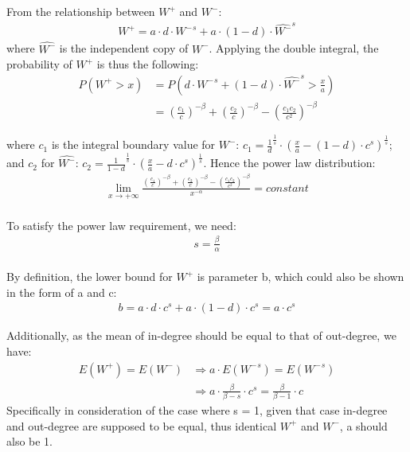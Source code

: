 \documentclass{article}
\begin{document}
From the relationship between $W^{+}$ and $W^{-}$: 
  \begin{align*}
 W^{+} = a \cdot d \cdot{W^{-}}^{s} + a \cdot (1-d) \cdot {\hat{W^{-}}} ^{s} 
 \end{align*}
 where $\hat{W^{-}}$ is the independent copy of $W^{-}$. Applying the double integral, the probability of $W^{+}$ is thus the following:
  \begin{align*}
 P( W^{+} > x ) & = P( d \cdot{W^{-}}^{s} + (1 - d) \cdot {\hat{W^{-}}} ^{s} > \frac{x}{a} ) \\
          & =  {(\frac{c_{1}}{c})}^{-\beta} +  {(\frac{c_{2}}{c})}^{-\beta} -  {(\frac{ c_{1}c_{2}   }{ c^{2} })}^{-\beta}
 \end{align*}
 
 where $c_{1}$ is the integral boundary value for $W^{-}$: $c_{1} = {\frac{1}{d}}^{\frac{1}{s}} \cdot {( \frac{x}{a} - (1-d) \cdot c^{s})}^{\frac{1}{s}}$; and $c_{2}$ for $\hat{W^{-}}$: 
 $c_{2} = {\frac{1}{1-d}}^{\frac{1}{s}} \cdot {( \frac{x}{a} - d \cdot c^{s})}^{\frac{1}{s}}$. Hence the power law distribution:
 \begin{align*}
\lim_{x \rightarrow +\infty } \frac{ {(\frac{c_{1}}{c})}^{-\beta} +  {(\frac{c_{2}}{c})}^{-\beta} -  {(\frac{ c_{1}c_{2}   }{ c^{2} })}^{-\beta}  }{x^{-\alpha}} = constant
\end{align*}
 \quad\\

To satisfy the power law requirement, we need:
  \begin{align*}
  s = \frac{\beta} {\alpha} 
 \end{align*}
 \quad\\
 By definition, the lower bound for $W^{+}$ is parameter b, which could also be shown in the form of a and c:
   \begin{align*}
  b = a \cdot d \cdot c^{s} + a \cdot (1-d) \cdot c^{s} = a \cdot c^{s}
 \end{align*}
 
 Additionally, as the mean of in-degree should be equal to that of out-degree, we have: 
  \begin{align*}
  E(W^{+}) = E(W^{-})  & \Rightarrow    a \cdot E({W^{-}}^{s}) = E({W^{-}}^{s})  \\
 & \Rightarrow    a \cdot \frac{\beta}{\beta - s} \cdot c^{s} = \frac{\beta}{\beta-1} \cdot c  
 \end{align*}
 Specifically in consideration of the case where s = 1, given that case in-degree and out-degree are supposed to be equal, thus identical $W^{+}$ and $W^{-}$, a should also be 1.
 
\end{document}
